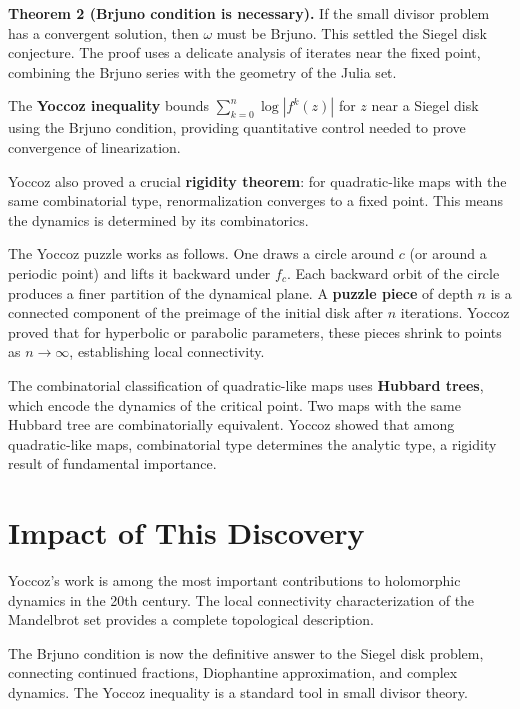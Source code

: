 \textbf{Theorem 2 (Brjuno condition is necessary).}
If the small divisor problem has a convergent solution, then
$\omega$ must be Brjuno.  This settled the Siegel disk conjecture.
The proof uses a delicate analysis of iterates near the fixed
point, combining the Brjuno series with the geometry of the Julia
set.

The \textbf{Yoccoz inequality} bounds
$\sum_{k=0}^{n}\log|f^{k}(z)|$ for $z$ near a Siegel disk using
the Brjuno condition, providing quantitative control needed to
prove convergence of linearization.

Yoccoz also proved a crucial \textbf{rigidity theorem}: for
quadratic-like maps with the same combinatorial type, renormalization
converges to a fixed point.  This means the dynamics is determined
by its combinatorics.

The Yoccoz puzzle works as follows.  One draws a circle around $c$
(or around a periodic point) and lifts it backward under $f_c$.
Each backward orbit of the circle produces a finer partition of the
dynamical plane.  A \textbf{puzzle piece} of depth $n$ is a
connected component of the preimage of the initial disk after $n$
iterations.  Yoccoz proved that for hyperbolic or parabolic
parameters, these pieces shrink to points as $n\to\infty$,
establishing local connectivity.

The combinatorial classification of quadratic-like maps uses
\textbf{Hubbard trees}, which encode the dynamics of the critical
point.  Two maps with the same Hubbard tree are combinatorially
equivalent.  Yoccoz showed that among quadratic-like maps,
combinatorial type determines the analytic type, a rigidity result
of fundamental importance.

\section{Impact of This Discovery}

Yoccoz's work is among the most important contributions to
holomorphic dynamics in the 20th century.  The local connectivity
characterization of the Mandelbrot set provides a complete
topological description.

The Brjuno condition is now the definitive answer to the Siegel
disk problem, connecting continued fractions, Diophantine
approximation, and complex dynamics.  The Yoccoz inequality is a
standard tool in small divisor theory.

